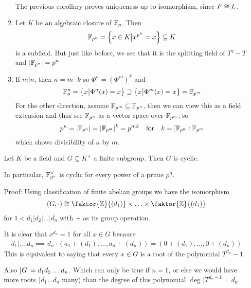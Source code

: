 \begin{enumerate}
		The previous corollary proves uniqueness up to isomorphism, since $F \cong L$.
	\item Let $K$ be an algebraic closure of $\mathbb{F}_p$. Then
		\begin{align*}
			\mathbb{F}_{p^{n}} = \left\{x \in K \big\vert x^{p^{n}} = x\right\} \subseteq K
		\end{align*}
		is a subfield. But just like before, we see that it is the splitting field of $T^{q} - T$ and $\vert\mathbb{F}_{p^{n}}\vert = p^{n}$

	\item If $m|n$, then $n = m \cdot k$ so $\Phi^{n} = \left( \Phi^{m}\right)^{k}$ and
		\begin{align*}
			\mathbb{F}_{p}^{n} = \left\{x \big\vert \Phi^{n}(x) = x\right\} \supseteq \left\{x \big\vert \Phi^{m}(x) = x\right\} = \mathbb{F}_{p^{m}}
		\end{align*} 
		For the other direction, assume $\mathbb{F}_{p^{m}} \subseteq \mathbb{F}_{p^{n}}$, then we can view this as a field extension and thus see $\mathbb{F}_{p^{n}}$ as a vector space over $\mathbb{F}_{p^{m}}$, so
		\begin{align*}
			p^{n} = \vert\mathbb{F}_{p^{n}}\vert = \vert\mathbb{F}_{p^{m}}\vert^{k} = p^{mk} \quad \text{for} \quad k = [\mathbb{F}_{p^{n}}: \mathbb{F}_{p^{m}}
		\end{align*}
		which shows divisibility of $n$ by $m$.
\end{enumerate}


\begin{theorem}[]
	Let $K$ be a field and $G \subseteq K^{\times}$ a finite subgroup. Then $G$ is cyclic.

	In particular, $\mathbb{F}_{p^{n}}^{\times}$ is cyclic for every power of a prime $p^{n}$.
\end{theorem}
Proof: Using classification of finite abelian groups we have the isomorphism
\begin{align*}
	(G, \cdot) \iso \faktor{\Z}{(d_1)} \times \ldots \times \faktor{\Z}{(d_1)}
\end{align*}
for $1 < d_1|d_2|\dots|d_n$ with $+$ as its group operation.

It is clear that $x^{d_n} = 1$ for all $x \in G$ because
\begin{align*}
	d_1|\dots|d_n \implies 
	d_n \cdot \left(
		a_1 + (d_1) ,\ldots, a_n + (d_n)
	\right) = (0 + (d_1), \ldots, 0 + (d_n))
\end{align*}
This is equivalent to saying that every $x \in G$ is a root of the polynomial $T^{d_n} - 1$. 

Also $\vert G\vert = d_1d_2 \dots d_n$. Which can only be true if $n = 1$, or else we would have more roots ($d_1\dots d_n$ many) than the degree of this polynomial $\deg(T^{d_n - 1} = d_n$.

